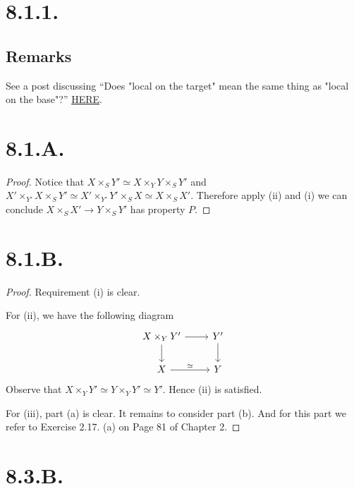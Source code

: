 \section{8.1.1.}

\subsection{Remarks}
See a post discussing \enquote{Does "local on the target" mean the same thing as "local on the base"?} \href{https://math.stackexchange.com/questions/2767806/does-local-on-the-target-mean-the-same-thing-as-local-on-the-base}{HERE}.

\section{8.1.A.}

\begin{proof}
Notice that $X\times_S Y'\simeq X\times_Y Y\times_S Y'$ and $X'\times_{Y'} X\times_S Y'\simeq X'\times_{Y'}Y'\times_S X\simeq X\times_S X'$. Therefore apply (ii) and (i) we can conclude $X\times_S X'\to Y\times_S Y'$ has property $P$.
\end{proof}


\section{8.1.B.}

\begin{proof}
    Requirement (i) is clear. 
    
    For (ii), we have the following diagram %
\[\begin{tikzcd}
	{X\times_Y Y'} & {Y'} \\
	X & Y
	\arrow[from=1-1, to=1-2]
	\arrow[from=1-1, to=2-1]
	\arrow[from=1-2, to=2-2]
	\arrow["\simeq", from=2-1, to=2-2]
\end{tikzcd}\]
Observe that $X\times_Y Y'\simeq Y\times_Y Y'\simeq Y'$. Hence (ii) is satisfied. 

For (iii), part (a) is clear. It remains to consider part (b). And for this part we refer to \cite{hartshorne2013algebraic} Exercise 2.17. (a) on Page 81 of Chapter 2. 
\end{proof}

\section{8.3.B.}

